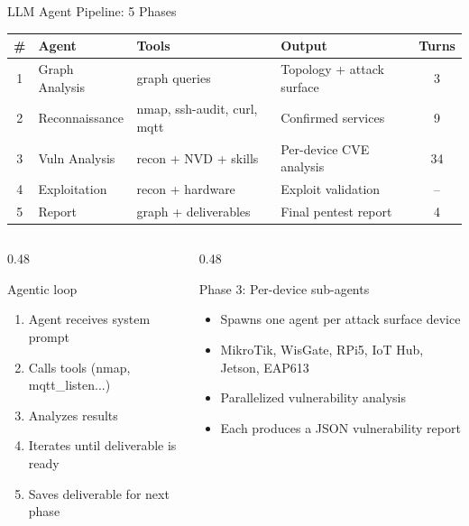 \documentclass[aspectratio=169]{beamer}
\begin{document}
\begin{frame}{LLM Agent Pipeline: 5 Phases}

\begin{table}
\centering
\small
\begin{tabular}{@{}clllc@{}}
\toprule
\textbf{\#} & \textbf{Agent} & \textbf{Tools} & \textbf{Output} & \textbf{Turns} \\
\midrule
1 & Graph Analysis & graph queries & Topology + attack surface & 3 \\
2 & Reconnaissance & nmap, ssh-audit, curl, mqtt & Confirmed services & 9 \\
3 & Vuln Analysis & recon + NVD + skills & Per-device CVE analysis & 34 \\
4 & Exploitation & recon + hardware & Exploit validation & -- \\
5 & Report & graph + deliverables & Final pentest report & 4 \\
\bottomrule
\end{tabular}
\end{table}

\vspace{0.3cm}
\begin{columns}[T]
\begin{column}{0.48\textwidth}
\begin{block}{Agentic loop}
\begin{enumerate}
    \item Agent receives system prompt
    \item Calls tools (nmap, mqtt\_listen...)
    \item Analyzes results
    \item Iterates until deliverable is ready
    \item Saves deliverable for next phase
\end{enumerate}
\end{block}
\end{column}
\begin{column}{0.48\textwidth}
\begin{block}{Phase 3: Per-device sub-agents}
\begin{itemize}
    \item Spawns one agent per attack surface device
    \item MikroTik, WisGate, RPi5, IoT Hub, Jetson, EAP613
    \item Parallelized vulnerability analysis
    \item Each produces a JSON vulnerability report
\end{itemize}
\end{block}
\end{column}
\end{columns}
\end{frame}
\end{document}
